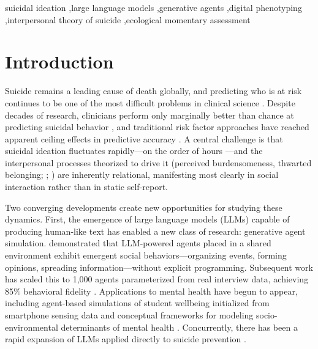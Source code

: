 \documentclass[review,12pt,authoryear]{elsarticle}
\begin{document}
\begin{frontmatter}
\begin{abstract}
moderate stability (Spearman-Brown $= .538$), with both halves independently predicting SI. These findings demonstrate that simulated social interaction can amplify latent vulnerability signals in a proof-of-concept that bridges digital phenotyping, generative AI, and suicide theory.
\end{abstract}

\begin{keyword}
suicidal ideation \sep large language models \sep generative agents \sep digital phenotyping \sep interpersonal theory of suicide \sep ecological momentary assessment
\end{keyword}

\end{frontmatter}

\linenumbers

\section{Introduction}

Suicide remains a leading cause of death globally, and predicting who is at risk continues to be one of the most difficult problems in clinical science \citep{franklin2017risk}. Despite decades of research, clinicians perform only marginally better than chance at predicting suicidal behavior \citep{large2017meta}, and traditional risk factor approaches have reached apparent ceiling effects in predictive accuracy \citep{belsher2019prediction}. A central challenge is that suicidal ideation fluctuates rapidly---on the order of hours \citep{kleiman2017examination}---and the interpersonal processes theorized to drive it (perceived burdensomeness, thwarted belonging; \citealt{joiner2005why}; \citealt{vanorden2010interpersonal}) are inherently relational, manifesting most clearly in social interaction rather than in static self-report.

Two converging developments create new opportunities for studying these dynamics. First, the emergence of large language models (LLMs) capable of producing human-like text has enabled a new class of research: generative agent simulation. \citet{park2023generative} demonstrated that LLM-powered agents placed in a shared environment exhibit emergent social behaviors---organizing events, forming opinions, spreading information---without explicit programming. Subsequent work has scaled this to 1,000 agents parameterized from real interview data, achieving 85\% behavioral fidelity \citep{park2024generative}. Applications to mental health have begun to appear, including agent-based simulations of student wellbeing initialized from smartphone sensing data \citep{zhao2025studentlife} and conceptual frameworks for modeling socio-environmental determinants of mental health \citep{kambeitz2025modelling}. Concurrently, there has been a rapid expansion of LLMs applied directly to suicide prevention \citep{holmes2025scoping}.
\end{document}
